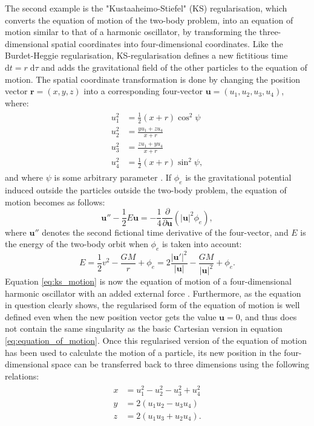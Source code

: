 \documentclass[english, twoside]{HYgradu}
\begin{document}
The second example is the "Kustaaheimo-Stiefel" (KS) regularisation, which converts the equation of motion of the two-body problem, into an equation of motion similar to that of a harmonic oscillator, by transforming the three-dimensional spatial coordinates into four-dimensional coordinates. Like the Burdet-Heggie regularisation, KS-regularisation defines a new fictitious time $\mathrm{d}t = r \; \mathrm{d}\tau$ and adds the gravitational field of the other particles to the equation of motion. The spatial coordinate transformation is done by changing the position vector $\mathbf{r} = (x, y, z)$ into a corresponding four-vector $\mathbf{u} = (u_1, u_2, u_3, u_4)$, where:
\begin{align}
\begin{split}
u_1^2& = \frac{1}{2}(x+r)\cos^2\psi \\
u_2^2& = \frac{yu_1+zu_4}{x+r} \\
u_3^2& = \frac{zu_1+yu_4}{x+r} \\
u_4^2& = \frac{1}{2}(x+r)\sin^2\psi,
\end{split}
\end{align}
and where $\psi$ is some arbitrary parameter \citep{BinneyTremaine}. If $\phi_e$ is the gravitational potential induced outside the particles outside the two-body problem, the equation of motion becomes as follows:
\begin{equation}
\mathbf{u}'' - \frac{1}{2} E \mathbf{u} = -\frac{1}{4} \frac{\partial}{\partial\mathbf{u}} \left( |\mathbf{u}|^2 \phi_e \right), \label{eq:ks_motion}
\end{equation} 
where $\mathbf{u}''$ denotes the second fictional time derivative of the four-vector, and $E$ is the energy of the two-body orbit when $\phi_e$ is taken into account:
\begin{equation}
E = \frac{1}{2}v^2 - \frac{GM}{r} + \phi_e = 2 \frac{|\mathbf{u'}|^2}{|\mathbf{u}|} - \frac{GM}{|\mathbf{u}|^2} + \phi_e.
\end{equation}
Equation \ref{eq:ks_motion} is now the equation of motion of a four-dimensional harmonic oscillator with an added external force \citep{BinneyTremaine}. Furthermore, as the equation in question clearly shows, the regularised form of the equation of motion is well defined even when the new position vector gets the value $\mathbf{u} = 0$, and thus does not contain the same singularity as the basic Cartesian version in equation \ref{eq:equation_of_motion}. Once this regularised version of the equation of motion has been used to calculate the motion of a particle, its new position in the four-dimensional space can be transferred back to three dimensions using the following relations:
\begin{align}
\begin{split}
x &= u_1^2 - u_2^2 - u_3^2 + u_4^2 \\
y &= 2 \left( u_1 u_2 - u_3 u_4 \right) \\
z &= 2 \left( u_1 u_3 + u_2 u_4 \right).
\end{split}
\end{align}
\end{document}
